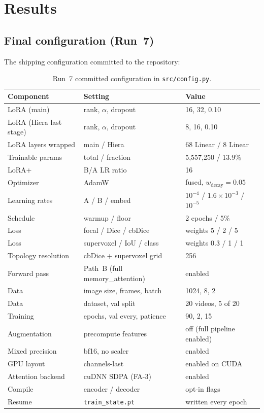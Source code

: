 \documentclass[11pt,a4paper]{article}
\begin{document}
\section{Results}
\label{sec:results}

\subsection{Final configuration (Run~7)}

The shipping configuration committed to the repository:

\begin{table}[ht!]
\centering
\small
\begin{tabular}{lll}
\toprule
Component & Setting & Value \\
\midrule
LoRA (main) & rank, $\alpha$, dropout & 16, 32, 0.10 \\
LoRA (Hiera last stage) & rank, $\alpha$, dropout & 8, 16, 0.10 \\
LoRA layers wrapped & main / Hiera & 68 Linear / 8 Linear \\
Trainable params & total / fraction & 5{,}557{,}250 / 13.9\% \\
LoRA+ & B/A LR ratio & 16 \\
Optimizer & AdamW & fused, $w_\text{decay}{=}0.05$ \\
Learning rates & A / B / embed & $10^{-4}$ / $1.6\!\times\!10^{-3}$ / $10^{-5}$ \\
Schedule & warmup / floor & 2 epochs / 5\% \\
Loss & focal / Dice / cbDice & weights 5 / 2 / 5 \\
Loss & supervoxel / IoU / class & weights 0.3 / 1 / 1 \\
Topology resolution & cbDice + supervoxel grid & 256 \\
Forward pass & Path~B (full memory\_attention) & enabled \\
Data & image size, frames, batch & 1024, 8, 2 \\
Data & dataset, val split & 20 videos, 5 of 20 \\
Training & epochs, val every, patience & 90, 2, 15 \\
Augmentation & precompute features & off (full pipeline enabled) \\
Mixed precision & bf16, no scaler & enabled \\
GPU layout & channels-last & enabled on CUDA \\
Attention backend & cuDNN SDPA (FA-3) & enabled \\
Compile & encoder / decoder & opt-in flags \\
Resume & \texttt{train\_state.pt} & written every epoch \\
\bottomrule
\end{tabular}
\caption{Run~7 committed configuration in \texttt{src/config.py}.}
\end{table}
\end{document}
